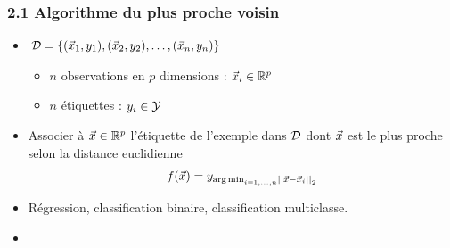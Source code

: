 \begin{frame}
  \frametitle{2.1 Algorithme du plus proche voisin}
  \begin{overlayarea}{\textwidth}{\textheight}
  \begin{itemize}
  \item<1->  $\mathcal{D} = \{(\vec{x}_1, y_1), (\vec{x}_2, y_2), \dots, (\vec{x}_n, y_n)\} $ 
    \begin{itemize}
    \item $n$ observations en $p$ dimensions : $\vec{x}_i \in {\mathbb R}^p$
    \item $n$ étiquettes : $y_i \in \mathcal{Y}$
    \end{itemize}
  \item<2->  Associer à $\vec{x} \in {\mathbb R}^p$ l'étiquette de l'exemple
    dans $\mathcal{D}$ dont $\vec{x}$ est le plus proche selon la distance euclidienne
  \[ f(\vec{x}) = y_{\operatorname*{arg\,min}_{i=1, \dots, n} \left|\left|\vec{x} - \vec{x}_i\right|\right|_2} \]
    \item<4-> Régression, classification binaire, classification multiclasse.
    \item<5-> 
    \end{itemize}
  \end{overlayarea}
\end{frame}

